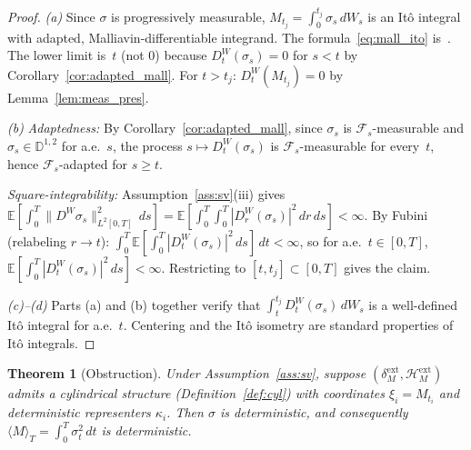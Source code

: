 \documentclass[11pt,a4paper]{article}
\theoremstyle{plain}
\newtheorem{theorem}{Theorem}[section]
\theoremstyle{definition}
\theoremstyle{remark}
\newcommand{\E}{\mathbb{E}}
\newcommand{\HM}{\mathcal{H}_M}
\begin{document}
\begin{proof}
\emph{(a)} Since $\sigma$ is progressively measurable, $M_{t_j} = \int_0^{t_j}\sigma_s\,dW_s$ is an It\^o integral with adapted, Malliavin-differentiable integrand. The formula~\eqref{eq:mall_ito} is~\cite[Proposition 1.3.3]{Nualart2006}. The lower limit is~$t$ (not $0$) because $D_t^W(\sigma_s) = 0$ for $s < t$ by Corollary~\ref{cor:adapted_mall}. For $t > t_j$: $D_t^W(M_{t_j}) = 0$ by Lemma~\ref{lem:meas_pres}.

\emph{(b)} \emph{Adaptedness:} By Corollary~\ref{cor:adapted_mall}, since $\sigma_s$ is $\mathcal{F}_s$-measurable and $\sigma_s \in \mathbb{D}^{1,2}$ for a.e.~$s$, the process $s \mapsto D_t^W(\sigma_s)$ is $\mathcal{F}_s$-measurable for every~$t$, hence $\mathcal{F}_s$-adapted for $s \ge t$.

\emph{Square-integrability:} Assumption~\ref{ass:sv}(iii) gives $\E[\int_0^T\|D^W\sigma_s\|^2_{L^2[0,T]}\,ds] = \E[\int_0^T\int_0^T|D_r^W(\sigma_s)|^2\,dr\,ds] < \infty$. By Fubini (relabeling $r \to t$): $\int_0^T\E[\int_0^T|D_t^W(\sigma_s)|^2\,ds]\,dt < \infty$, so for a.e.~$t \in [0,T]$, $\E[\int_0^T|D_t^W(\sigma_s)|^2\,ds] < \infty$. Restricting to $[t,t_j] \subset [0,T]$ gives the claim.

\emph{(c)--(d)} Parts (a) and (b) together verify that $\int_t^{t_j} D_t^W(\sigma_s)\,dW_s$ is a well-defined It\^o integral for a.e.~$t$. Centering and the It\^o isometry are standard properties of It\^o integrals.
\end{proof}

\begin{theorem}[Obstruction]\label{thm:obstr}
Under Assumption~\ref{ass:sv}, suppose $(\delta_M^{\mathrm{ext}}, \HM^{\mathrm{ext}})$ admits a cylindrical structure (Definition~\ref{def:cyl}) with coordinates $\xi_i = M_{t_i}$ and \emph{deterministic} representers $\kappa_i$. Then $\sigma$ is deterministic, and consequently $\langle M\rangle_T = \int_0^T \sigma_t^2\,dt$ is deterministic.
\end{theorem}
\end{document}
